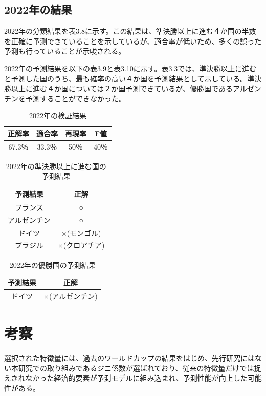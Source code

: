 \documentclass[platex]{suribt}
\begin{document}
\subsection{2022年の結果}
2022年の分類結果を表3.8に示す。この結果は、準決勝以上に進む４か国の半数を正確に予測できていることを示しているが、適合率が低いため、多くの誤った予測も行っていることが示唆される。

2022年の予測結果を以下の表3.9と表3.10に示す。表3.3では、準決勝以上に進むと予測した国のうち、最も確率の高い４か国を予測結果として示している。準決勝以上に進む４か国については２か国予測できているが、優勝国であるアルゼンチンを予測することができなかった。

\begin{table}
  \centering
  \begin{tabular}{|c|c|c|c|}
    \hline
    正解率 & 適合率 & 再現率 & F値 \\ \hline
    67.3％ & 33.3％ & 50％ & 40％ \\ \hline
  \end{tabular}
  \caption{2022年の検証結果}
\end{table}

\begin{table}
  \centering
  \begin{tabular}{|c|c|}
    \hline
    予測結果 & 正解 \\ \hline
    フランス & ○ \\ \hline
    アルゼンチン & ○ \\ \hline
    ドイツ & ×(モンゴル) \\ \hline
    ブラジル & ×(クロアチア) \\ \hline
  \end{tabular}
  \caption{2022年の準決勝以上に進む国の予測結果}
\end{table}

\begin{table}
  \centering
  \begin{tabular}{|c|c|}
    \hline
    予測結果 & 正解 \\ \hline
    ドイツ & ×(アルゼンチン) \\ \hline
  \end{tabular}
  \caption{2022年の優勝国の予測結果}
\end{table}

\section{考察}
選択された特徴量には、過去のワールドカップの結果をはじめ、先行研究にはない本研究での取り組みであるジニ係数が選ばれており、従来の特徴量だけでは捉えきれなかった経済的要素が予測モデルに組み込まれ、予測性能が向上した可能性がある。
\end{document}

